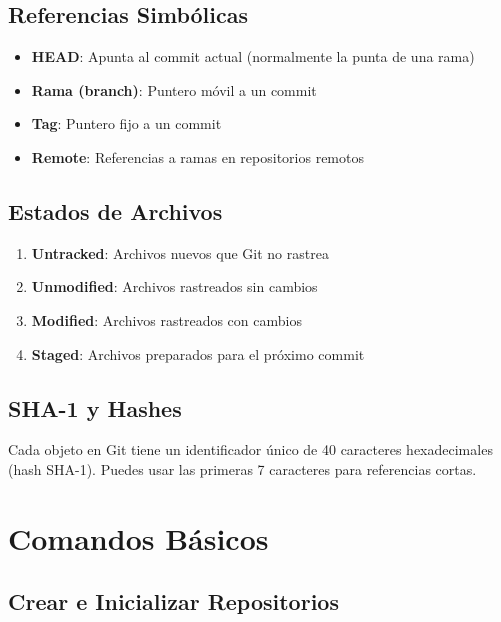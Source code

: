 \documentclass[
  doc,
  floatsintext,
  longtable,
  a4paper,
  nolmodern,
  notxfonts,
  notimes,
  12pt,
  colorlinks=true,linkcolor=blue,citecolor=blue,urlcolor=blue]{apa7}
\providecommand{\tightlist}{%
  \setlength{\itemsep}{0pt}\setlength{\parskip}{0pt}}
\begin{document}
\subsection{Referencias Simbólicas}\label{referencias-simbuxf3licas}

\begin{itemize}
\tightlist
\item
  \textbf{HEAD}: Apunta al commit actual (normalmente la punta de una
  rama)
\item
  \textbf{Rama (branch)}: Puntero móvil a un commit
\item
  \textbf{Tag}: Puntero fijo a un commit
\item
  \textbf{Remote}: Referencias a ramas en repositorios remotos
\end{itemize}

\subsection{Estados de Archivos}\label{estados-de-archivos}

\begin{enumerate}
\def\labelenumi{\arabic{enumi}.}
\tightlist
\item
  \textbf{Untracked}: Archivos nuevos que Git no rastrea
\item
  \textbf{Unmodified}: Archivos rastreados sin cambios
\item
  \textbf{Modified}: Archivos rastreados con cambios
\item
  \textbf{Staged}: Archivos preparados para el próximo commit
\end{enumerate}

\subsection{SHA-1 y Hashes}\label{sha-1-y-hashes}

Cada objeto en Git tiene un identificador único de 40 caracteres
hexadecimales (hash SHA-1). Puedes usar las primeras 7 caracteres para
referencias cortas.

\section{Comandos Básicos}\label{comandos-buxe1sicos}

\subsection{Crear e Inicializar
Repositorios}\label{crear-e-inicializar-repositorios}
\end{document}
